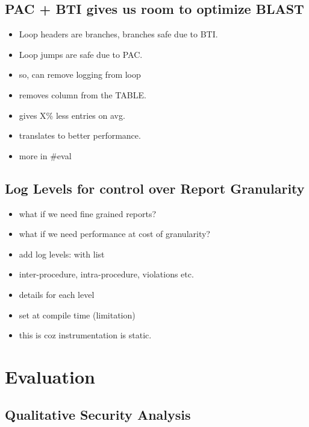 \documentclass[a4paper, nobind]{templates/ociamthesis}
\providecommand{\tightlist}{%
  \setlength{\itemsep}{0pt}\setlength{\parskip}{0pt}}
\begin{document}
\section{PAC + BTI gives us room to optimize BLAST}\label{pac-bti-gives-us-room-to-optimize-blast}

\begin{itemize}
\tightlist
\item
  Loop headers are branches, branches safe due to BTI.
\item
  Loop jumps are safe due to PAC.
\item
  so, can remove logging from loop
\item
  removes column from the TABLE.
\item
  gives X\% less entries on avg.
\item
  translates to better performance.
\item
  more in \#eval
\end{itemize}

\section{Log Levels for control over Report Granularity}\label{log-levels-for-control-over-report-granularity}

\begin{itemize}
\tightlist
\item
  what if we need fine grained reports?
\item
  what if we need performance at cost of granularity?
\item
  add log levels: with list
\item
  inter-procedure, intra-procedure, violations etc.
\item
  details for each level
\item
  set at compile time (limitation)
\item
  this is coz instrumentation is static.
\end{itemize}

\chapter{Evaluation}\label{evaluation}

\minitoc 

\section{Qualitative Security Analysis}\label{qualitative-security-analysis}
\end{document}
